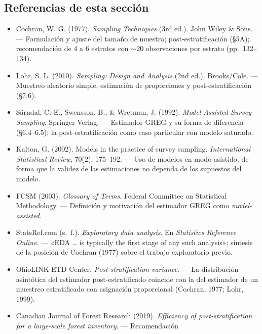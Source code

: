 \subsection*{Referencias de esta sección}

{\sloppy
\begin{itemize}
  \item Cochran, W. G. (1977). \emph{Sampling Techniques} (3rd ed.). John Wiley
        \& Sons. --- Formulación y ajuste del tamaño de muestra;
        post-estratificación (\S5A); recomendación de 4 a 6 estratos con
        $\sim$20 observaciones por estrato (pp.~132--134).
  \item Lohr, S. L. (2010). \emph{Sampling: Design and Analysis} (2nd ed.).
        Brooks/Cole. --- Muestreo aleatorio simple, estimación de proporciones y
        post-estratificación (\S7.6).
  \item Särndal, C.-E., Swensson, B., \& Wretman, J. (1992). \emph{Model Assisted
        Survey Sampling}. Springer-Verlag. --- Estimador GREG y su forma de
        diferencia (\S6.4--6.5); la post-estratificación como caso particular con
        modelo saturado.
  \item Kalton, G. (2002). Models in the practice of survey sampling.
        \emph{International Statistical Review}, 70(2), 175--192. --- Uso de
        modelos en modo asistido, de forma que la validez de las estimaciones no
        dependa de los supuestos del modelo.
  \item FCSM (2003). \emph{Glossary of Terms}. Federal Committee on Statistical
        Methodology. --- Definición y motivación del estimador GREG como
        \emph{model-assisted}.
  \item StatsRef.com (s.~f.). \emph{Exploratory data analysis}. En
        \emph{Statistics Reference Online}. --- «EDA \dots{} is typically the
        first stage of any such analysis»; síntesis de la posición de Cochran
        (1977) sobre el trabajo exploratorio previo.
  \item OhioLINK ETD Center. \emph{Post-stratification variance}. --- La
        distribución asintótica del estimador post-estratificado coincide con la
        del estimador de un muestreo estratificado con asignación proporcional
        (Cochran, 1977; Lohr, 1999).
  \item Canadian Journal of Forest Research (2019). \emph{Efficiency of
        post-stratification for a large-scale forest inventory}. --- Recomendación

\end{itemize}}
